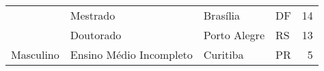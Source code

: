 \begin{table}[h]
\begin{tabular}{|l|l|l|l|r|}
                             & Mestrado                       & Brasília            & DF & 14                      \\ \cline{2-5} 
                             & Doutorado & Porto Alegre        & RS & 13                      \\ \cline{2-5} 
\multirow{-32}{*}{Masculino} & Ensino Médio Incompleto        & Curitiba            & PR & 5                       \\ \hline
\end{tabular}
\end{table}